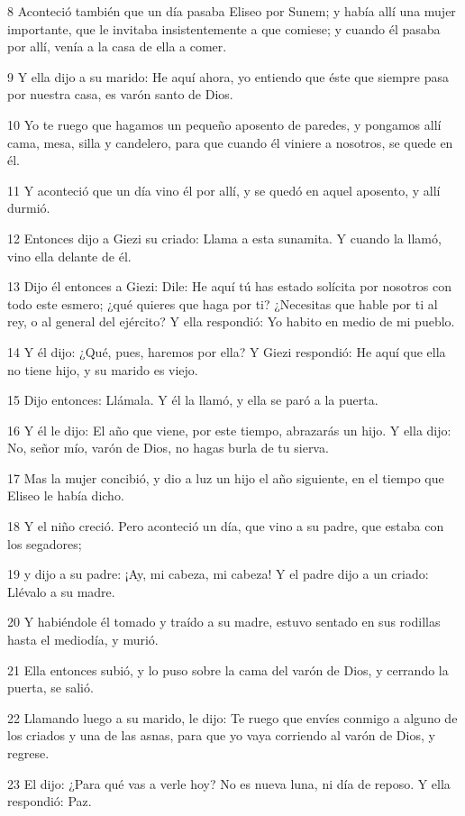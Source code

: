 \par 8 Aconteció también que un día pasaba Eliseo por Sunem; y había allí una mujer importante, que le invitaba insistentemente a que comiese; y cuando él pasaba por allí, venía a la casa de ella a comer.
\par 9 Y ella dijo a su marido: He aquí ahora, yo entiendo que éste que siempre pasa por nuestra casa, es varón santo de Dios.
\par 10 Yo te ruego que hagamos un pequeño aposento de paredes, y pongamos allí cama, mesa, silla y candelero, para que cuando él viniere a nosotros, se quede en él.
\par 11 Y aconteció que un día vino él por allí, y se quedó en aquel aposento, y allí durmió.
\par 12 Entonces dijo a Giezi su criado: Llama a esta sunamita. Y cuando la llamó, vino ella delante de él.
\par 13 Dijo él entonces a Giezi: Dile: He aquí tú has estado solícita por nosotros con todo este esmero; ¿qué quieres que haga por ti? ¿Necesitas que hable por ti al rey, o al general del ejército? Y ella respondió: Yo habito en medio de mi pueblo.
\par 14 Y él dijo: ¿Qué, pues, haremos por ella? Y Giezi respondió: He aquí que ella no tiene hijo, y su marido es viejo.
\par 15 Dijo entonces: Llámala. Y él la llamó, y ella se paró a la puerta.
\par 16 Y él le dijo: El año que viene, por este tiempo, abrazarás un hijo. Y ella dijo: No, señor mío, varón de Dios, no hagas burla de tu sierva.
\par 17 Mas la mujer concibió, y dio a luz un hijo el año siguiente, en el tiempo que Eliseo le había dicho.
\par 18 Y el niño creció. Pero aconteció un día, que vino a su padre, que estaba con los segadores;
\par 19 y dijo a su padre: ¡Ay, mi cabeza, mi cabeza! Y el padre dijo a un criado: Llévalo a su madre.
\par 20 Y habiéndole él tomado y traído a su madre, estuvo sentado en sus rodillas hasta el mediodía, y murió.
\par 21 Ella entonces subió, y lo puso sobre la cama del varón de Dios, y cerrando la puerta, se salió.
\par 22 Llamando luego a su marido, le dijo: Te ruego que envíes conmigo a alguno de los criados y una de las asnas, para que yo vaya corriendo al varón de Dios, y regrese.
\par 23 El dijo: ¿Para qué vas a verle hoy? No es nueva luna, ni día de reposo. Y ella respondió: Paz.
